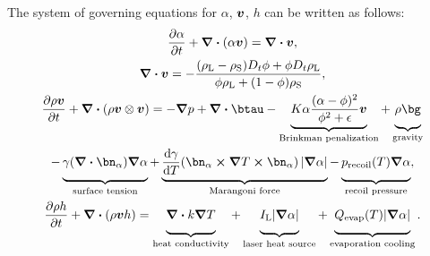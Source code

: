 \documentclass[
portrait,
a0paper%
]
{baposter}
\begin{document}
\begin{poster}
{  The system of governing equations for $\alpha$, $\vb*{v}$, $h$ can be written as follows:
  \begin{gather*}
    \partialderivative{\alpha}{t} +  \div (\alpha \bv) = \div \bv,
    \label{eq: advection_VOF}\\ 
    \div \bv = - \frac{(\rho_{\text{L}} - \rho_{\text{S}})D_t \phi + \phi D_t \rho_{\text{L}}}{\phi \rho_{\text{L}} + (1-\phi) \rho_{\text{S}}},
    \label{eq: mass_conservation}\\
    \begin{gathered}
        \pdv{\rho\bv}{t} 
        + \div (\rho \bv \otimes \bv)
        = 
        - \grad p
        + \grad \vdot \btau
        - \myunderbrace{K\alpha\frac{(\alpha-\phi)^2}{\phi^2 + \epsilon}\bv}{Brinkman penalization} 
        + \myunderbrace{\rho\bg}{gravity} \\
        - \myunderbrace{\gamma\qty(\div\bn_\alpha)\grad\alpha}{surface tension}
        + \myunderbrace{\dv{\gamma}{T}\qty(\bn_\alpha\cp\grad{T}\cp\bn_\alpha)|\grad \alpha|}{Marangoni force}
        - \myunderbrace{p_{\text{recoil}}(T)\grad \alpha}{recoil pressure},
    \end{gathered}\\
    \begin{gathered}
        \partialderivative{\rho h}{t} 
        + \div (\rho \bv h) 
        =
        \myunderbrace{\div k \grad{T}}{heat conductivity}
        + \myunderbrace{I_{\text{L}} |\grad \alpha|}{laser heat source}
        + \myunderbrace{Q_{\text{evap}}(T)|\grad \alpha|}{evaporation cooling}.
    \end{gathered}\label{eq: h_eq}
\end{gather*}

}
\end{poster}
\end{document}

